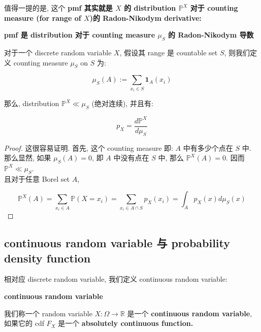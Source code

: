 \documentclass{qlnotes-export}
\begin{document}
值得一提的是, 这个 \textbf{pmf 其实就是 \(X\) 的 distribution \({\mathbb{P}}^{X}\) 对于 counting measure (for range of \(X\))的 Radon-Nikodym derivative:}

\begin{proposition}{\protect{}\label{kn-pmf-distribution-counting-measure-mu-s-radon-nikodym}{\textbf{pmf
是 distribution 对于 counting measure \(\mu_{S}\) 的 Radon-Nikodym
导数}}}

对于一个 discrete random variable \(X\), 假设其 range 是 countable set \(S\), 则我们定义 counting measure \(\mu_{S}\) on \(S\) 为:

\[\mu_{S}(A) := \sum\limits_{x_{i} \in S}\mathbf{1}_{A}(x_{i})\]

那么, distribution \({\mathbb{P}}^{X} \ll \mu_{S}\) (绝对连续), 并且有:

\[p_{X} = \frac{d{\mathbb{P}}^{X}}{d\mu_{S}}\]

\end{proposition}

\begin{proof}

这很容易证明. 首先, 这个 counting measure 即: \(A\) 中有多少个点在 \(S\) 中.\\
那么显然, 如果 \(\mu_{S}(A) = 0\), 即 \(A\) 中没有点在 \(S\) 中, 那么 \({\mathbb{P}}^{X}(A) = 0\). 因而 \({\mathbb{P}}^{X} \ll \mu_{S}\).\\
且对于任意 Borel set \(A\),

\[{\mathbb{P}}^{X}(A) = \sum\limits_{x_{i} \in A}{\mathbb{P}}(X = x_{i}) = \sum\limits_{x_{i} \in A \cap S}p_{X}(x_{i}) = \int_{A}p_{X}(x) d\mu_{S}(x)\]

\end{proof}

\subsection{continuous random variable 与 probability density function}\label{continuous-random-variable-ux4e0e-probability-density-function}

相对应 discrete random variable, 我们定义 continuous random variable:

\begin{definition}{\protect{}\label{kn-continuous-random-variable}{\textbf{continuous
random variable}}}

我们称一个 random variable \(X:\Omega\rightarrow{\mathbb{R}}\) 是一个 \textbf{continuous random variable}, 如果它的 cdf \(F_{X}\) 是一个 \textbf{absolutely continuous function.}

\end{definition}
\end{document}
